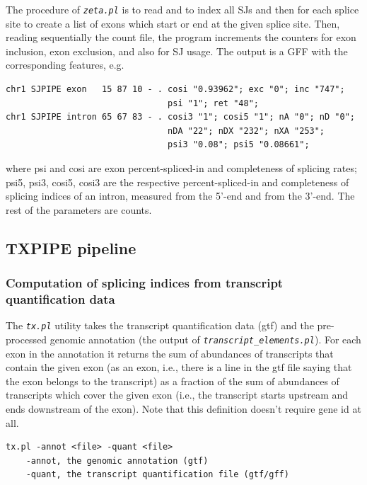 \documentclass{article}
\newcommand{\prog}[1]{{\tt\em #1}}
\begin{document}
The procedure of \prog{zeta.pl} is to read and to index all SJs and then for each splice site to create a list of exons which start or end at the given splice site. 
Then, reading sequentially the count file, the program increments the counters for exon inclusion, exon exclusion, and also for SJ usage. The output is a GFF with 
the corresponding features, e.g.
\begin{verbatim}
chr1 SJPIPE exon   15 87 10 - . cosi "0.93962"; exc "0"; inc "747"; 
                                psi "1"; ret "48";
chr1 SJPIPE intron 65 67 83 - . cosi3 "1"; cosi5 "1"; nA "0"; nD "0"; 
                                nDA "22"; nDX "232"; nXA "253"; 
                                psi3 "0.08"; psi5 "0.08661";
\end{verbatim}
where psi and cosi are exon percent-spliced-in and completeness of splicing rates; psi5, psi3, cosi5, cosi3 
are the respective percent-spliced-in and completeness of splicing indices of an intron, measured from the 
5'-end and from the 3'-end. The rest of the parameters are counts.


\subsection{TXPIPE pipeline}
\label{sec::txpipe}
\subsubsection[Splicing indices from transcript quantification data]{Computation of splicing indices from transcript quantification data}

The \prog{tx.pl} utility takes the transcript quantification data (gtf) and the pre-processed genomic annotation (the output of
\prog{transcript\_elements.pl}). For each exon in the annotation it returns the sum of abundances of transcripts that contain 
the given exon (as an exon, i.e., there is a line in the gtf file saying that the exon belongs to the transcript) as a fraction 
of the sum of abundances of transcripts which cover the given exon (i.e., the transcript starts upstream and ends downstream of the 
exon). Note that this definition doesn't require gene id at all.

\begin{verbatim}
tx.pl -annot <file> -quant <file>
	-annot, the genomic annotation (gtf)
	-quant, the transcript quantification file (gtf/gff)
\end{verbatim}
\end{document}
